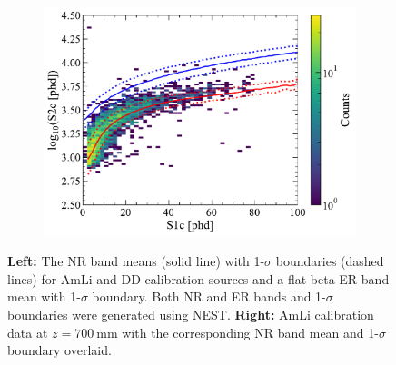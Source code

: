 \begin{enumerate}
\begin{figure}[!ht]
\begin{subfigure}[b]{0.49\textwidth}
        \includegraphics[width=\textwidth]{figures/VetoEfficiency/AmLi700_NRBands.pdf}
        \caption{}
        \label{fig:VetoEff/AmLi700_NRBands}
    \end{subfigure}
    \caption{\textbf{Left:} The NR band means (solid line) with 1-$\sigma$ boundaries (dashed lines) for AmLi and DD calibration sources and a flat beta ER band mean with 1-$\sigma$ boundary. Both NR and ER bands and 1-$\sigma$ boundaries were generated using NEST. \textbf{Right:} AmLi calibration data at $z=700~\text{mm}$ with the corresponding NR band mean and 1-$\sigma$ boundary overlaid.}
    \label{fig:VetoEff/SR3NRBands&AmLi700mmData}
\end{figure}

\end{enumerate}

